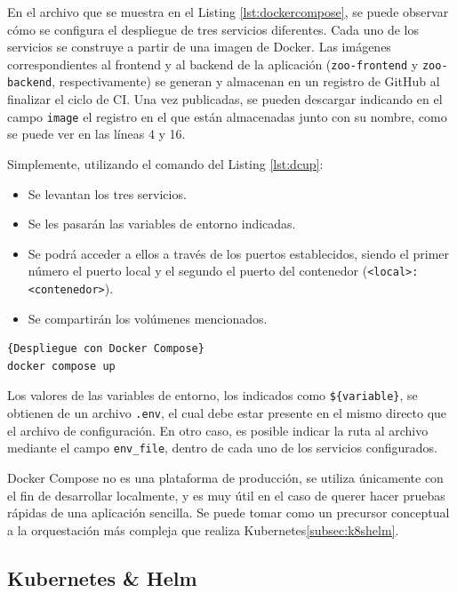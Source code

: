En el archivo que se muestra en el Listing \ref{lst:dockercompose}, se puede observar cómo se configura el despliegue de tres servicios diferentes. Cada uno de los servicios se construye a partir de una imagen de Docker. Las imágenes correspondientes al frontend y al backend de la aplicación (\texttt{zoo-frontend} y \texttt{zoo-backend}, respectivamente) se generan y almacenan en un registro de GitHub al finalizar el ciclo de CI. Una vez publicadas, se pueden descargar indicando en el campo \texttt{image} el registro en el que están almacenadas junto con su nombre, como se puede ver en las líneas 4 y 16.

Simplemente, utilizando el comando del Listing \ref{lst:dcup}:

\begin{itemize}
  \item Se levantan los tres servicios.
  \item Se les pasarán las variables de entorno indicadas.
  \item Se podrá acceder a ellos a través de los puertos establecidos, siendo el primer número el puerto local y el segundo el puerto del contenedor (\texttt{<local>:<contenedor>}).
  \item Se compartirán los volúmenes mencionados.
\end{itemize}

\begin{lstlisting}[language=bash,label=lst:dcup]{Despliegue con Docker Compose}
docker compose up
\end{lstlisting}

Los valores de las variables de entorno, los indicados como \texttt{\$\{variable\}}, se obtienen de un archivo \texttt{.env}, el cual debe estar presente en el mismo directo que el archivo de configuración. En otro caso, es posible indicar la ruta al archivo mediante el campo \texttt{env\_file}, dentro de cada uno de los servicios configurados.

Docker Compose no es una plataforma de producción, se utiliza únicamente con el fin de desarrollar localmente, y es muy útil en el caso de querer hacer pruebas rápidas de una aplicación sencilla. Se puede tomar como un precursor conceptual a la orquestación más compleja que realiza Kubernetes\ref{subsec:k8shelm}.

\subsection*{Kubernetes \& Helm}
\label{subsec:k8shelm}

